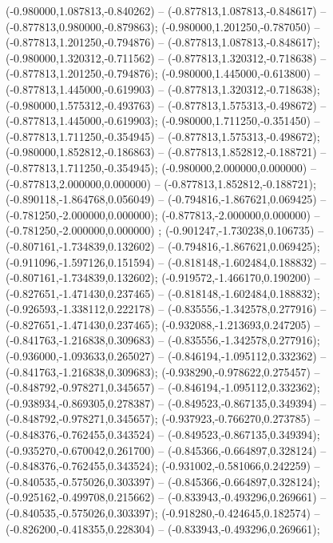  (-0.980000,1.087813,-0.840262) -- (-0.877813,1.087813,-0.848617) -- (-0.877813,0.980000,-0.879863);
 (-0.980000,1.201250,-0.787050) -- (-0.877813,1.201250,-0.794876) -- (-0.877813,1.087813,-0.848617);
 (-0.980000,1.320312,-0.711562) -- (-0.877813,1.320312,-0.718638) -- (-0.877813,1.201250,-0.794876);
 (-0.980000,1.445000,-0.613800) -- (-0.877813,1.445000,-0.619903) -- (-0.877813,1.320312,-0.718638);
 (-0.980000,1.575312,-0.493763) -- (-0.877813,1.575313,-0.498672) -- (-0.877813,1.445000,-0.619903);
 (-0.980000,1.711250,-0.351450) -- (-0.877813,1.711250,-0.354945) -- (-0.877813,1.575313,-0.498672);
 (-0.980000,1.852812,-0.186863) -- (-0.877813,1.852812,-0.188721) -- (-0.877813,1.711250,-0.354945);
 (-0.980000,2.000000,0.000000) -- (-0.877813,2.000000,0.000000) -- (-0.877813,1.852812,-0.188721);
 (-0.890118,-1.864768,0.056049) -- (-0.794816,-1.867621,0.069425) -- (-0.781250,-2.000000,0.000000);
 (-0.877813,-2.000000,0.000000) -- (-0.781250,-2.000000,0.000000) ;
 (-0.901247,-1.730238,0.106735) -- (-0.807161,-1.734839,0.132602) -- (-0.794816,-1.867621,0.069425);
 (-0.911096,-1.597126,0.151594) -- (-0.818148,-1.602484,0.188832) -- (-0.807161,-1.734839,0.132602);
 (-0.919572,-1.466170,0.190200) -- (-0.827651,-1.471430,0.237465) -- (-0.818148,-1.602484,0.188832);
 (-0.926593,-1.338112,0.222178) -- (-0.835556,-1.342578,0.277916) -- (-0.827651,-1.471430,0.237465);
 (-0.932088,-1.213693,0.247205) -- (-0.841763,-1.216838,0.309683) -- (-0.835556,-1.342578,0.277916);
 (-0.936000,-1.093633,0.265027) -- (-0.846194,-1.095112,0.332362) -- (-0.841763,-1.216838,0.309683);
 (-0.938290,-0.978622,0.275457) -- (-0.848792,-0.978271,0.345657) -- (-0.846194,-1.095112,0.332362);
 (-0.938934,-0.869305,0.278387) -- (-0.849523,-0.867135,0.349394) -- (-0.848792,-0.978271,0.345657);
 (-0.937923,-0.766270,0.273785) -- (-0.848376,-0.762455,0.343524) -- (-0.849523,-0.867135,0.349394);
 (-0.935270,-0.670042,0.261700) -- (-0.845366,-0.664897,0.328124) -- (-0.848376,-0.762455,0.343524);
 (-0.931002,-0.581066,0.242259) -- (-0.840535,-0.575026,0.303397) -- (-0.845366,-0.664897,0.328124);
 (-0.925162,-0.499708,0.215662) -- (-0.833943,-0.493296,0.269661) -- (-0.840535,-0.575026,0.303397);
 (-0.918280,-0.424645,0.182574) -- (-0.826200,-0.418355,0.228304) -- (-0.833943,-0.493296,0.269661);
